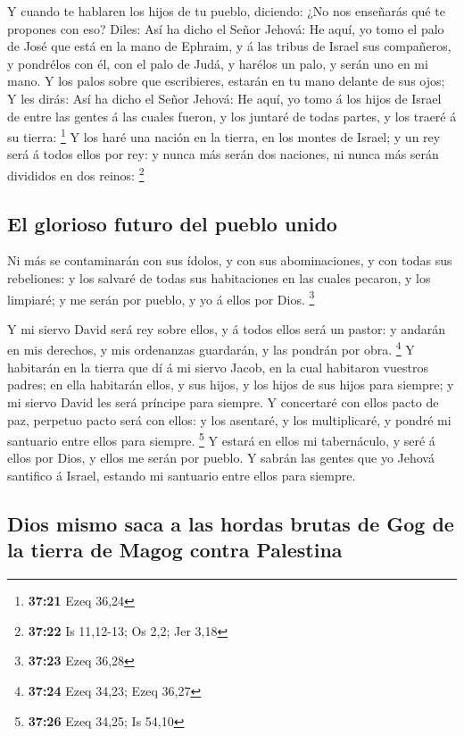  Y cuando te hablaren los hijos de tu pueblo, diciendo:
¿No nos enseñarás qué te propones con eso?  Diles: Así ha
dicho el Señor Jehová: He aquí, yo tomo el palo de José que está en la
mano de Ephraim, y á las tribus de Israel sus compañeros, y pondrélos
con él, con el palo de Judá, y harélos un palo, y serán uno en mi mano.
 Y los palos sobre que escribieres, estarán en tu mano
delante de sus ojos;  Y les dirás: Así ha dicho el Señor
Jehová: He aquí, yo tomo á los hijos de Israel de entre las gentes á las
cuales fueron, y los juntaré de todas partes, y los traeré á su tierra:
\footnote{\textbf{37:21} Ezeq 36,24}  Y los haré una
nación en la tierra, en los montes de Israel; y un rey será á todos
ellos por rey: y nunca más serán dos naciones, ni nunca más serán
divididos en dos reinos: \footnote{\textbf{37:22} Is 11,12-13; Os 2,2;
  Jer 3,18}

\hypertarget{el-glorioso-futuro-del-pueblo-unido}{%
\subsection{El glorioso futuro del pueblo
unido}\label{el-glorioso-futuro-del-pueblo-unido}}

 Ni más se contaminarán con sus ídolos, y con sus
abominaciones, y con todas sus rebeliones: y los salvaré de todas sus
habitaciones en las cuales pecaron, y los limpiaré; y me serán por
pueblo, y yo á ellos por Dios. \footnote{\textbf{37:23} Ezeq 36,28}

 Y mi siervo David será rey sobre ellos, y á todos ellos
será un pastor: y andarán en mis derechos, y mis ordenanzas guardarán, y
las pondrán por obra. \footnote{\textbf{37:24} Ezeq 34,23; Ezeq 36,27}
 Y habitarán en la tierra que dí á mi siervo Jacob, en la
cual habitaron vuestros padres; en ella habitarán ellos, y sus hijos, y
los hijos de sus hijos para siempre; y mi siervo David les será príncipe
para siempre.  Y concertaré con ellos pacto de paz,
perpetuo pacto será con ellos: y los asentaré, y los multiplicaré, y
pondré mi santuario entre ellos para siempre. \footnote{\textbf{37:26}
  Ezeq 34,25; Is 54,10}  Y estará en ellos mi
tabernáculo, y seré á ellos por Dios, y ellos me serán por pueblo.
 Y sabrán las gentes que yo Jehová santifico á Israel,
estando mi santuario entre ellos para siempre.

\hypertarget{dios-mismo-saca-a-las-hordas-brutas-de-gog-de-la-tierra-de-magog-contra-palestina}{%
\subsection{Dios mismo saca a las hordas brutas de Gog de la tierra de
Magog contra
Palestina}\label{dios-mismo-saca-a-las-hordas-brutas-de-gog-de-la-tierra-de-magog-contra-palestina}}

